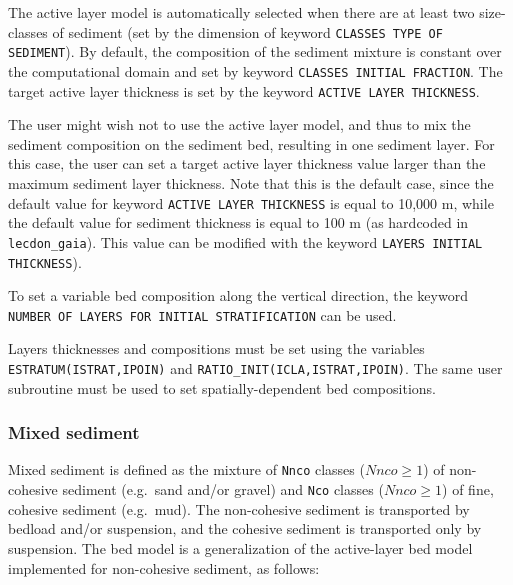 The active layer model is automatically selected when there are at least two size-classes of sediment (set by the dimension of keyword \texttt{CLASSES TYPE OF SEDIMENT}).
By default, the composition of the sediment mixture is constant over the computational domain and set by keyword \texttt{CLASSES INITIAL FRACTION}.
The target active layer thickness is set by the keyword \texttt{ACTIVE LAYER THICKNESS}.

The user might wish not to use the active layer model, and thus to mix the sediment composition on the sediment bed, resulting in one sediment layer. For this case, the user can set a target active layer thickness value larger than the maximum sediment layer thickness. Note that this is the default case, since the default value for keyword \texttt{ACTIVE LAYER THICKNESS} is equal to 10,000 m, while the default value for sediment thickness is equal to 100 m (as hardcoded in \texttt{lecdon\_gaia}). This value can be modified with the keyword \texttt{LAYERS INITIAL THICKNESS}).

To set a variable bed composition along the vertical direction, the keyword \texttt{NUMBER OF LAYERS FOR INITIAL STRATIFICATION} can be used.

Layers thicknesses and compositions must be set using the variables \texttt{ESTRATUM(ISTRAT,IPOIN)} and \texttt{RATIO\_INIT(ICLA,ISTRAT,IPOIN)}. The same user subroutine must be used to set spatially-dependent bed compositions.

\subsubsection{Mixed sediment}
Mixed sediment is defined as the mixture of \texttt{Nnco} classes ($Nnco \geq 1$) of non-cohesive sediment (e.g.~sand and/or gravel) and \texttt{Nco} classes ($Nnco \geq 1$) of fine, cohesive sediment (e.g.~mud). The non-cohesive sediment is transported by bedload and/or suspension, and the cohesive sediment is transported only by suspension. The bed model is a generalization of the active-layer bed model implemented for non-cohesive sediment, as follows:

